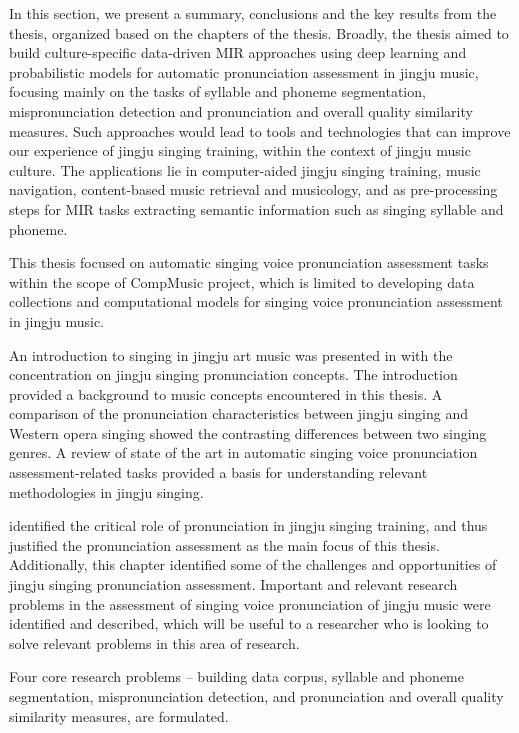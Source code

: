 In this section, we present a summary, conclusions and the key results from the thesis, organized based on the chapters of the thesis. Broadly, the thesis aimed to build culture-specific data-driven MIR approaches using deep learning and probabilistic models for automatic pronunciation assessment in jingju music, focusing mainly on the tasks of syllable and phoneme segmentation, mispronunciation detection and pronunciation and overall quality similarity measures. Such approaches would lead to tools and technologies that can improve our experience of jingju singing training, within the context of jingju music culture. The applications lie in computer-aided jingju singing training, music navigation, content-based music retrieval and musicology, and as pre-processing steps for MIR tasks extracting semantic information such as singing syllable and phoneme.

This thesis focused on automatic singing voice pronunciation assessment tasks within the scope of CompMusic project, which is limited to developing data collections and computational models for singing voice pronunciation assessment in jingju music.

An introduction to singing in jingju art music was presented in  with the concentration on jingju singing pronunciation concepts. The introduction provided a background to music concepts encountered in this thesis. A comparison of the pronunciation characteristics between jingju singing and Western opera singing showed the contrasting differences between two singing genres. A review of state of the art in automatic singing voice pronunciation assessment-related tasks provided a basis for understanding relevant methodologies in jingju singing.

 identified the critical role of pronunciation in jingju singing training, and thus justified the pronunciation assessment as the main focus of this thesis. Additionally, this chapter identified some of the challenges and opportunities of jingju singing pronunciation assessment. Important and relevant research problems in the assessment of singing voice pronunciation of jingju music were identified and described, which will be useful to a researcher who is looking to solve relevant problems in this area of research.

Four core research problems -- building data corpus, syllable and phoneme segmentation, mispronunciation detection, and pronunciation and overall quality similarity measures, are formulated.

